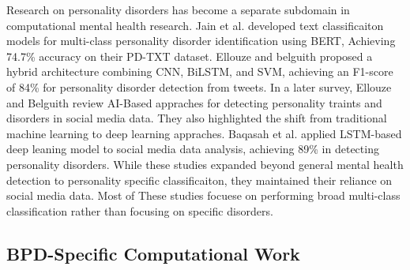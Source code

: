 \documentclass{article}
\begin{document}
Research on personality disorders has become a separate subdomain in computational mental health research. Jain et al.\cite{jain2024} developed text classificaiton models for multi-class personality disorder identification using BERT, Achieving 74.7\% accuracy on their PD-TXT dataset. Ellouze and belguith \cite{ellouze2022hybrid} proposed a hybrid architecture combining CNN, BiLSTM, and SVM, achieving an F1-score of 84\% for personality disorder detection from tweets. In a later survey, Ellouze and Belguith \cite{ellouze2024artificial} review AI-Based appraches for detecting personality traints and disorders in social media data. They also highlighted the shift from traditional machine learning to deep learning appraches. Baqasah et al.\cite{baqasah2024personality} applied LSTM-based deep leaning model to social media data analysis, achieving 89\% in detecting personality disorders. While these studies expanded beyond general mental health detection to personality specific classificaiton, they maintained their reliance on social media data. Most of These studies focuese on performing broad multi-class classification rather than focusing on specific disorders.








\subsection{BPD-Specific Computational Work}

\end{document}
